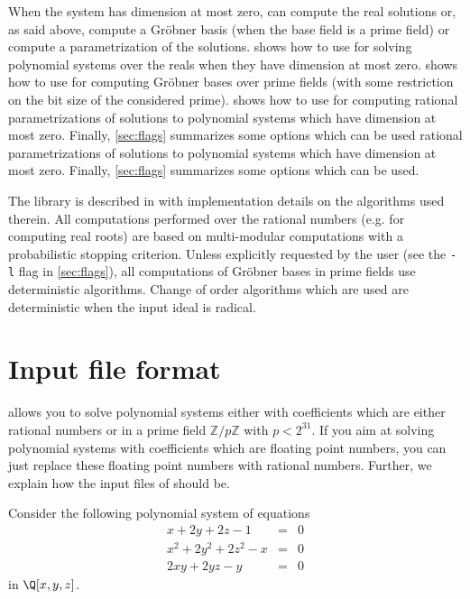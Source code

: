 \documentclass[a4paper,english,11pt]{scrartcl}
\theoremstyle{definition}
\theoremstyle{remark}
\begin{document}
When the system has dimension at most zero, \msolve can compute the real solutions
or, as said above, compute a Gr\"obner basis (when the base field is a prime field)
or compute a parametrization of the solutions.
 shows how to use \msolve for solving polynomial
systems over the reals when they have dimension at most zero.
 shows how to use \msolve for computing
Gr\"obner bases over prime fields (with some restriction on the bit size of the
considered prime).  shows how to use \msolve for computing rational
parametrizations of solutions to polynomial systems which have dimension at most
zero. Finally, \cref{sec:flags} summarizes some options which can be used rational
parametrizations of solutions to polynomial systems which have dimension at most
zero. Finally, \cref{sec:flags} summarizes some options which can be used.

The \msolve library is described in \cite{msolve} with implementation details on
the algorithms used therein. All computations performed over the rational numbers
(e.g. for computing real roots) are based on multi-modular computations with a
probabilistic stopping criterion. Unless explicitly requested by the user (see the
\verb+-l+ flag in \cref{sec:flags}), all computations of Gr\"obner bases
in prime fields use deterministic
algorithms. Change of order algorithms which are used are deterministic
when the input ideal is radical.

\section{Input file format}\label{sec:input}

\msolve allows you to solve polynomial systems either with coefficients
which are either rational numbers or in a prime field $\mathbb{Z}/p\mathbb{Z}$
with $p < 2^{31}$. If you aim at solving polynomial systems with coefficients
which are floating point numbers, you can just replace these floating point
numbers with rational numbers. Further, we explain how the input files of
\msolve should be.

Consider the following polynomial system of equations
\[
  \begin{array}{rcl}
    x+2 y+2 z-1 &= &0\\
    x^2+2 y^2+2 z^2-x &= &0\\
    2 x y+2 y z-y &= &0
  \end{array}
\]
in $\Q[x,y,z]$.
\end{document}
